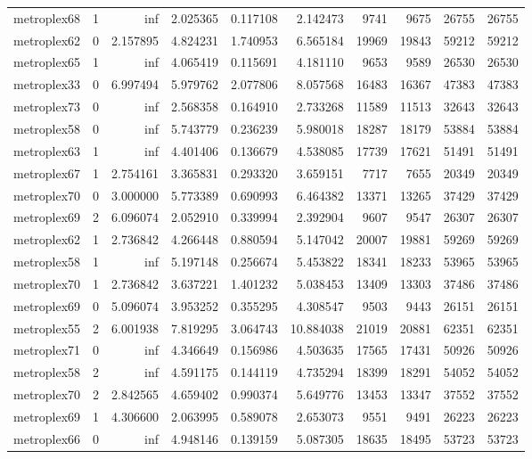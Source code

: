 \begin{longtable}{|l|r|r|r|r|r|r|r|r|r|}
metroplex68 & 1 & inf & 2.025365 & 0.117108 & 2.142473 & 9741 & 9675 & 26755 & 26755 \\
metroplex62 & 0 & 2.157895 & 4.824231 & 1.740953 & 6.565184 & 19969 & 19843 & 59212 & 59212 \\
metroplex65 & 1 & inf & 4.065419 & 0.115691 & 4.181110 & 9653 & 9589 & 26530 & 26530 \\
metroplex33 & 0 & 6.997494 & 5.979762 & 2.077806 & 8.057568 & 16483 & 16367 & 47383 & 47383 \\
metroplex73 & 0 & inf & 2.568358 & 0.164910 & 2.733268 & 11589 & 11513 & 32643 & 32643 \\
metroplex58 & 0 & inf & 5.743779 & 0.236239 & 5.980018 & 18287 & 18179 & 53884 & 53884 \\
metroplex63 & 1 & inf & 4.401406 & 0.136679 & 4.538085 & 17739 & 17621 & 51491 & 51491 \\
metroplex67 & 1 & 2.754161 & 3.365831 & 0.293320 & 3.659151 & 7717 & 7655 & 20349 & 20349 \\
metroplex70 & 0 & 3.000000 & 5.773389 & 0.690993 & 6.464382 & 13371 & 13265 & 37429 & 37429 \\
metroplex69 & 2 & 6.096074 & 2.052910 & 0.339994 & 2.392904 & 9607 & 9547 & 26307 & 26307 \\
metroplex62 & 1 & 2.736842 & 4.266448 & 0.880594 & 5.147042 & 20007 & 19881 & 59269 & 59269 \\
metroplex58 & 1 & inf & 5.197148 & 0.256674 & 5.453822 & 18341 & 18233 & 53965 & 53965 \\
metroplex70 & 1 & 2.736842 & 3.637221 & 1.401232 & 5.038453 & 13409 & 13303 & 37486 & 37486 \\
metroplex69 & 0 & 5.096074 & 3.953252 & 0.355295 & 4.308547 & 9503 & 9443 & 26151 & 26151 \\
metroplex55 & 2 & 6.001938 & 7.819295 & 3.064743 & 10.884038 & 21019 & 20881 & 62351 & 62351 \\
metroplex71 & 0 & inf & 4.346649 & 0.156986 & 4.503635 & 17565 & 17431 & 50926 & 50926 \\
metroplex58 & 2 & inf & 4.591175 & 0.144119 & 4.735294 & 18399 & 18291 & 54052 & 54052 \\
metroplex70 & 2 & 2.842565 & 4.659402 & 0.990374 & 5.649776 & 13453 & 13347 & 37552 & 37552 \\
metroplex69 & 1 & 4.306600 & 2.063995 & 0.589078 & 2.653073 & 9551 & 9491 & 26223 & 26223 \\
metroplex66 & 0 & inf & 4.948146 & 0.139159 & 5.087305 & 18635 & 18495 & 53723 & 53723 \\

\end{longtable}
